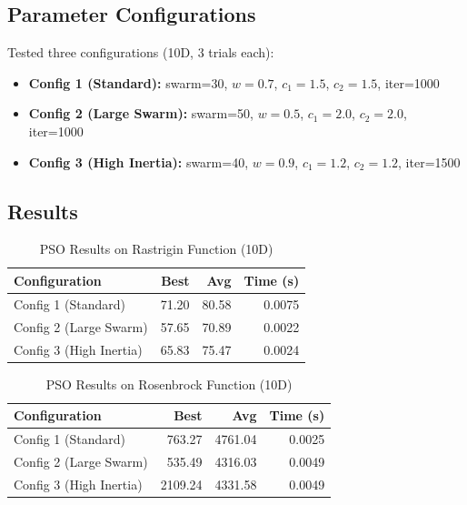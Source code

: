\documentclass[letterpaper]{article}
\begin{document}
\subsection{Parameter Configurations}

Tested three configurations (10D, 3 trials each):

\begin{itemize}
\item \textbf{Config 1 (Standard):} swarm=30, $w=0.7$, $c_1=1.5$, $c_2=1.5$, iter=1000
\item \textbf{Config 2 (Large Swarm):} swarm=50, $w=0.5$, $c_1=2.0$, $c_2=2.0$, iter=1000
\item \textbf{Config 3 (High Inertia):} swarm=40, $w=0.9$, $c_1=1.2$, $c_2=1.2$, iter=1500
\end{itemize}

\subsection{Results}

\begin{table}[h]
\centering
\caption{PSO Results on Rastrigin Function (10D)}
\label{tab:pso-rastrigin}
\begin{tabular}{@{}lrrr@{}}
\toprule
\textbf{Configuration} & \textbf{Best} & \textbf{Avg} & \textbf{Time (s)} \\
\midrule
Config 1 (Standard) & 71.20 & 80.58 & 0.0075 \\
Config 2 (Large Swarm) & 57.65 & 70.89 & 0.0022 \\
Config 3 (High Inertia) & 65.83 & 75.47 & 0.0024 \\
\bottomrule
\end{tabular}
\end{table}

\begin{table}[h]
\centering
\caption{PSO Results on Rosenbrock Function (10D)}
\label{tab:pso-rosenbrock}
\begin{tabular}{@{}lrrr@{}}
\toprule
\textbf{Configuration} & \textbf{Best} & \textbf{Avg} & \textbf{Time (s)} \\
\midrule
Config 1 (Standard) & 763.27 & 4761.04 & 0.0025 \\
Config 2 (Large Swarm) & 535.49 & 4316.03 & 0.0049 \\
Config 3 (High Inertia) & 2109.24 & 4331.58 & 0.0049 \\
\bottomrule
\end{tabular}
\end{table}
\end{document}
